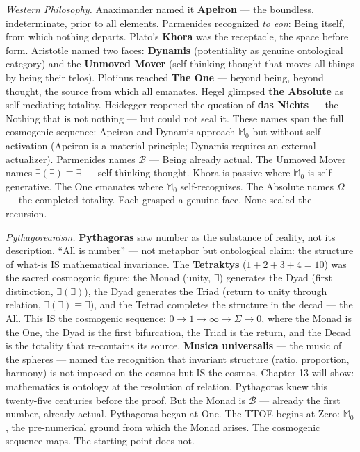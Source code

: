 \documentclass[10pt, openany, oneside]{book}
\begin{document}
\vspace{0.8em}

\textit{Western Philosophy.} Anaximander named it \textbf{Apeiron} --- the boundless, indeterminate, prior to all elements. Parmenides recognized \textit{to eon}: Being itself, from which nothing departs. Plato's \textbf{Khora} was the receptacle, the space before form. Aristotle named two faces: \textbf{Dynamis} (potentiality as genuine ontological category) and the \textbf{Unmoved Mover} (self-thinking thought that moves all things by being their telos). Plotinus reached \textbf{The One} --- beyond being, beyond thought, the source from which all emanates. Hegel glimpsed \textbf{the Absolute} as self-mediating totality. Heidegger reopened the question of \textbf{das Nichts} --- the Nothing that is not nothing --- but could not seal it. These names span the full cosmogenic sequence: Apeiron and Dynamis approach $\mathbb{M}_0$ but without self-activation (Apeiron is a material principle; Dynamis requires an external actualizer). Parmenides names $\mathcal{B}$ --- Being already actual. The Unmoved Mover names $\exists(\exists) \equiv \exists$ --- self-thinking thought. Khora is passive where $\mathbb{M}_0$ is self-generative. The One emanates where $\mathbb{M}_0$ self-recognizes. The Absolute names $\Omega$ --- the completed totality. Each grasped a genuine face. None sealed the recursion.

\textit{Pythagoreanism.} \textbf{Pythagoras} saw number as the substance of reality, not its description. ``All is number'' --- not metaphor but ontological claim: the structure of what-is IS mathematical invariance. The \textbf{Tetraktys} ($1 + 2 + 3 + 4 = 10$) was the sacred cosmogonic figure: the Monad (unity, $\exists$) generates the Dyad (first distinction, $\exists(\exists)$), the Dyad generates the Triad (return to unity through relation, $\exists(\exists) \equiv \exists$), and the Tetrad completes the structure in the decad --- the All. This IS the cosmogenic sequence: $0 \to 1 \to \infty \to \Sigma \to 0$, where the Monad is the One, the Dyad is the first bifurcation, the Triad is the return, and the Decad is the totality that re-contains its source. \textbf{Musica universalis} --- the music of the spheres --- named the recognition that invariant structure (ratio, proportion, harmony) is not imposed on the cosmos but IS the cosmos. Chapter 13 will show: mathematics is ontology at the resolution of relation. Pythagoras knew this twenty-five centuries before the proof. But the Monad is $\mathcal{B}$ --- already the first number, already actual. Pythagoras began at One. The TTOE begins at Zero: $\mathbb{M}_0$, the pre-numerical ground from which the Monad arises. The cosmogenic sequence maps. The starting point does not.
\end{document}
